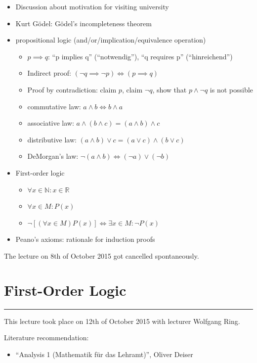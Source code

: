 \documentclass[a4paper,landscape,twocolumn]{article}
\newcommand\meta[3]{\hrule{} This #1 took place on #2 with lecturer #3.\par}
\begin{document}
\begin{itemize}
  \item Discussion about motivation for visiting university
  \item Kurt Gödel: Gödel's incompleteness theorem
  \item propositional logic (and/or/implication/equivalence operation)
  \begin{itemize}
    \item $p \implies q$: \enquote{p implies q} (\enquote{notwendig}), \enquote{q requires p} (\enquote{hinreichend})
    \item Indirect proof: $(\neg q \implies \neg p) \Leftrightarrow (p \implies q)$
    \item Proof by contradiction: claim $p$, claim $\neg q$, show that $p \land \neg q$ is not possible
    \item commutative law: $a \land b \Leftrightarrow b \land a$
    \item associative law: $a \land (b \land c) = (a \land b) \land c$
    \item distributive law: $(a \land b) \lor c = (a \lor c) \land (b \lor c)$
    \item DeMorgan's law: $\neg (a \land b) \Leftrightarrow (\neg a) \lor (\neg b)$
  \end{itemize}
  \item First-order logic
  \begin{itemize}
    \item $\forall x \in \mathbb{N}: x \in \mathbb{R}$
    \item $\forall x \in M: P(x)$
    \item $\neg \left[(\forall x \in M) P(x)\right] \Leftrightarrow \exists x \in M: \neg P(x)$
  \end{itemize}
  \item Peano's axioms: rationale for induction proofs
\end{itemize}

The lecture on 8th of October 2015 got cancelled spontaneously.

\section{First-Order Logic}
\meta{lecture}{12th of October 2015}{Wolfgang Ring}

Literature recommendation:
\begin{itemize}
  \item \enquote{\foreignlanguage{ngerman}{Analysis 1 (Mathematik für das Lehramt)}}, Oliver Deiser
\end{itemize}
\end{document}
